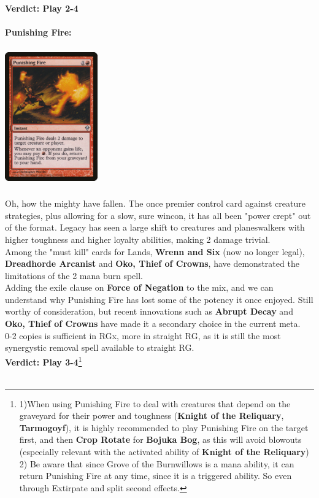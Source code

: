 \documentclass{report}
\begin{document}
\textbf{Verdict: Play 2-4}\\\\
\textbf{Punishing Fire:\\}
\begin{center}
\includegraphics [width = 4cm, height = 6cm] {punishing-fire}
\end{center}
Oh, how the mighty have fallen. The once premier control card against creature strategies, plus allowing for a slow, sure wincon, it has all been "power crept" out of the format. Legacy has seen a large shift to creatures and planeswalkers with higher toughness and higher loyalty abilities, making 2 damage trivial.\\Among the "must kill" cards for Lands, \textbf{Wrenn and Six} (now no longer legal), \textbf{Dreadhorde Arcanist} and \textbf{Oko, Thief of Crowns}, have demonstrated the limitations of the 2 mana burn spell.\\Adding the exile clause on \textbf{Force of Negation} to the mix, and we can understand why Punishing Fire has lost some of the potency it once enjoyed. Still worthy of consideration, but recent innovations such as \textbf{Abrupt Decay} and \textbf{Oko, Thief of Crowns} have made it a secondary choice in the current meta.\\0-2 copies is sufficient in RGx, more in straight RG, as it is still the most synergystic removal spell available to straight RG.\\
\textbf{Verdict: Play 3-4}\footnote{1)When using Punishing Fire to deal with creatures that depend on the graveyard for their power and toughness (\textbf{Knight of the Reliquary}, \textbf{Tarmogoyf}), it is highly recommended to play Punishing Fire on the target first, and then \textbf{Crop Rotate} for \textbf{Bojuka Bog}, as this will avoid blowouts (especially relevant with the activated ability of \textbf{Knight of the Reliquary})\\
2) Be aware that since Grove of the Burnwillows is a mana ability, it can return Punishing Fire at any time, since it is a triggered ability. So even through Extirpate and split second effects.}\\\\
\end{document}
